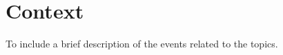 \section{Context}
\label{sec:Context}
To include a brief description of the events related to the topics.
